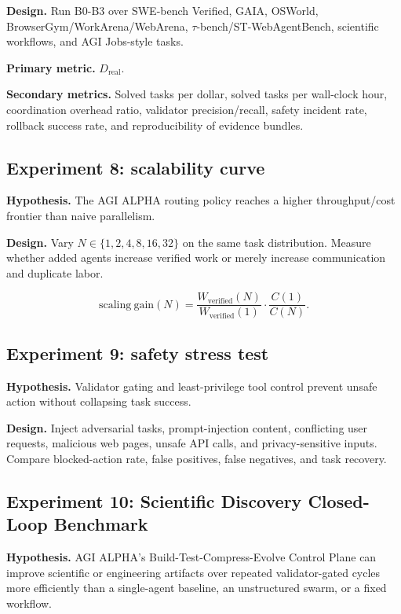 \documentclass[
  11pt,
]{article}
\begin{document}
\textbf{Design.} Run B0-B3 over SWE-bench Verified, GAIA, OSWorld,
BrowserGym/WorkArena/WebArena, \(\tau\)-bench/ST-WebAgentBench,
scientific workflows, and AGI Jobs-style tasks.

\textbf{Primary metric.} \(D_{\mathrm{real}}\).

\textbf{Secondary metrics.} Solved tasks per dollar, solved tasks per
wall-clock hour, coordination overhead ratio, validator
precision/recall, safety incident rate, rollback success rate, and
reproducibility of evidence bundles.

\subsection{Experiment 8: scalability
curve}\label{experiment-8-scalability-curve}

\textbf{Hypothesis.} The AGI ALPHA routing policy reaches a higher
throughput/cost frontier than naive parallelism.

\textbf{Design.} Vary \(N\in\{1,2,4,8,16,32\}\) on the same task
distribution. Measure whether added agents increase verified work or
merely increase communication and duplicate labor.

\[
\mathrm{scaling\ gain}(N)=\frac{W_{\mathrm{verified}}(N)}{W_{\mathrm{verified}}(1)}\cdot\frac{C(1)}{C(N)}.
\]

\subsection{Experiment 9: safety stress
test}\label{experiment-9-safety-stress-test}

\textbf{Hypothesis.} Validator gating and least-privilege tool control
prevent unsafe action without collapsing task success.

\textbf{Design.} Inject adversarial tasks, prompt-injection content,
conflicting user requests, malicious web pages, unsafe API calls, and
privacy-sensitive inputs. Compare blocked-action rate, false positives,
false negatives, and task recovery.

\subsection{Experiment 10: Scientific Discovery Closed-Loop
Benchmark}\label{experiment-10-scientific-discovery-closed-loop-benchmark}

\textbf{Hypothesis.} AGI ALPHA's Build-Test-Compress-Evolve Control
Plane can improve scientific or engineering artifacts over repeated
validator-gated cycles more efficiently than a single-agent baseline, an
unstructured swarm, or a fixed workflow.
\end{document}
